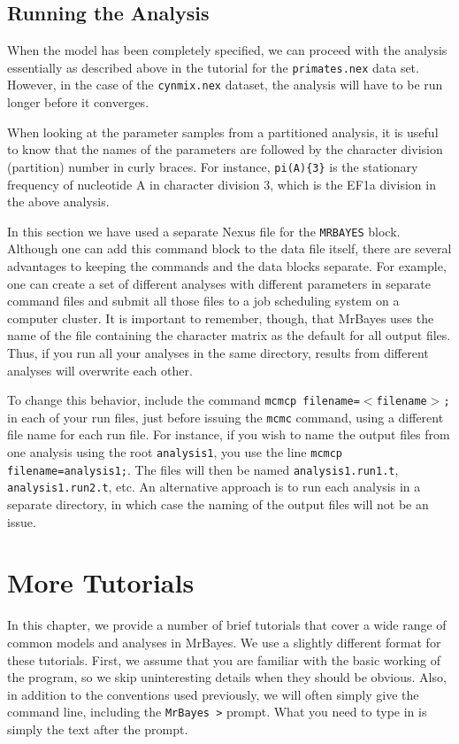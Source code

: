 \documentclass[12pt]{book}
\begin{document}
\section{Running the Analysis}

When the model has been completely specified, we can proceed with the analysis essentially as
described above in the tutorial for the \texttt{primates.nex} data set. However, in the case of the
\texttt{cynmix.nex} dataset, the analysis will have to be run longer before it converges.

When looking at the parameter samples from a partitioned analysis, it is useful to know that the
names of the parameters are followed by the character division (partition) number in curly braces.
For instance, \texttt{pi(A)\{3\}} is the stationary frequency of nucleotide A in character division
3, which is the EF1a division in the above analysis.

In this section we have used a separate Nexus file for the \texttt{MRBAYES} block. Although one can
add this command block to the data file itself, there are several advantages to keeping the
commands and the data blocks separate. For example, one can create a set of different analyses with
different parameters in separate command files and submit all those files to a job scheduling
system on a computer cluster. It is important to remember, though, that MrBayes uses the name of
the file containing the character matrix as the default for all output files. Thus, if you run all
your analyses in the same directory, results from different analyses will overwrite each other.

To change this behavior, include the command \texttt{mcmcp filename=$<$filename$>$;} in each of
your run files, just before issuing the \texttt{mcmc} command, using a different file name for each
run file. For instance, if you wish to name the output files from one analysis using the root
\texttt{analysis1}, you use the line \texttt{mcmcp filename=analysis1;}. The files will then be
named \texttt{analysis1.run1.t}, \texttt{analysis1.run2.t}, etc. An alternative approach is to run
each analysis in a separate directory, in which case the naming of the output files will not be an
issue.

\chapter{More Tutorials}\label{tutorialAdvanced}

In this chapter, we provide a number of brief tutorials that cover a wide range of common models
and analyses in MrBayes. We use a slightly different format for these tutorials. First, we assume
that you are familiar with the basic working of the program, so we skip uninteresting details when
they should be obvious. Also, in addition to the conventions used previously, we will often simply
give the command line, including the \texttt{MrBayes >} prompt. What you need to type in is simply
the text after the prompt.
\end{document}
